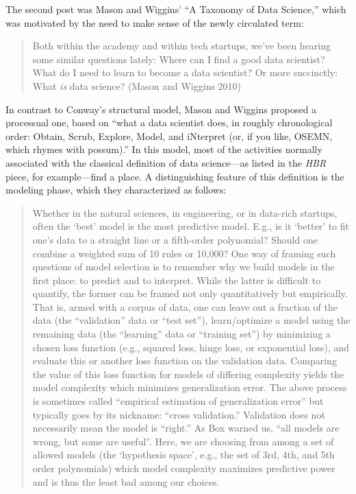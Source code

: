 \documentclass[
  letterpaper,
]{report}
\begin{document}
The second post was Mason and Wiggins' ``A Taxonomy of Data Science,''
which was motivated by the need to make sense of the newly circulated
term:

\begin{quote}
Both within the academy and within tech startups, we've been hearing
some similar questions lately: Where can I find a good data scientist?
What do I need to learn to become a data scientist? Or more succinctly:
What \emph{is} data science? (Mason and Wiggins 2010)
\end{quote}

In contrast to Conway's structural model, Mason and Wiggins proposed a
processual one, based on ``what a data scientist does, in roughly
chronological order: Obtain, Scrub, Explore, Model, and iNterpret (or,
if you like, OSEMN, which rhymes with possum).'' In this model, most of
the activities normally associated with the classical definition of data
science---as listed in the \emph{HBR} piece, for example---find a place.
A distinguishing feature of this definition is the modeling phase, which
they characterized as follows:

\begin{quote}
Whether in the natural sciences, in engineering, or in data-rich
startups, often the `best' model is the most predictive model. E.g., is
it `better' to fit one's data to a straight line or a fifth-order
polynomial? Should one combine a weighted sum of 10 rules or 10,000? One
way of framing such questions of model selection is to remember why we
build models in the first place: to predict and to interpret. While the
latter is difficult to quantify, the former can be framed not only
quantitatively but empirically. That is, armed with a corpus of data,
one can leave out a fraction of the data (the ``validation'' data or
``test set''), learn/optimize a model using the remaining data (the
``learning'' data or ``training set'') by minimizing a chosen loss
function (e.g., squared loss, hinge loss, or exponential loss), and
evaluate this or another loss function on the validation data. Comparing
the value of this loss function for models of differing complexity
yields the model complexity which minimizes generalization error. The
above process is sometimes called ``empirical estimation of
generalization error'' but typically goes by its nickname: ``cross
validation.'' Validation does not necessarily mean the model is
``right.'' As Box warned us, ``all models are wrong, but some are
useful''. Here, we are choosing from among a set of allowed models (the
`hypothesis space', e.g., the set of 3rd, 4th, and 5th order
polynomials) which model complexity maximizes predictive power and is
thus the least bad among our choices.
\end{quote}
\end{document}
